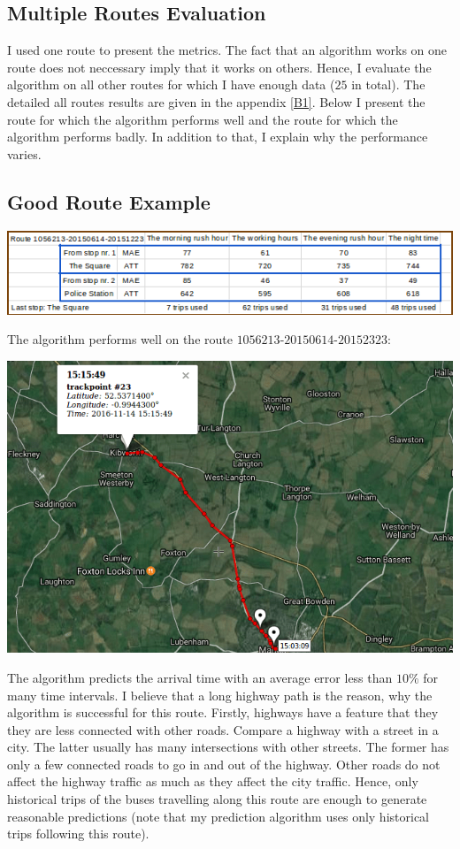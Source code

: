 \documentclass[12pt,a4paper,oneside,openright]{report}
\begin{document}
\subsection{Multiple Routes Evaluation}

I used one route to present the metrics. The fact that an algorithm works on one route
does not neccessary imply that it works on others. Hence, I evaluate the algorithm on
all other routes for which I have enough data ($25$ in total). The
detailed all routes results are given in the appendix \textcolor{blue}{\ref{B1}}. Below I present
the route for which the algorithm performs well and the route for which the algorithm performs badly.
In addition to that, I explain why the performance varies. \\

\subsection*{Good Route Example}

\includegraphics[width=\textwidth]{figs/table_of_1056213.png}

The algorithm performs well on the route $1056213$-$20150614$-$20152323$:

\includegraphics[scale=0.65]{figs/best_route.png}

The algorithm predicts the arrival time with an average error less than $10\%$ for
many time intervals. I believe that a long highway path is the reason, why the algorithm
is successful for this route. Firstly, highways have a feature that they they are less
connected with other roads. Compare a highway with a street in a city. The latter usually has many
intersections with other streets. The former has only a few connected roads to go in and out
of the highway. Other roads do not affect the highway traffic as much as they affect the city traffic.
Hence, only historical trips of the buses travelling along this route are enough to generate
reasonable predictions (note that my prediction algorithm uses only historical trips
following this route). \\ 
\end{document}
